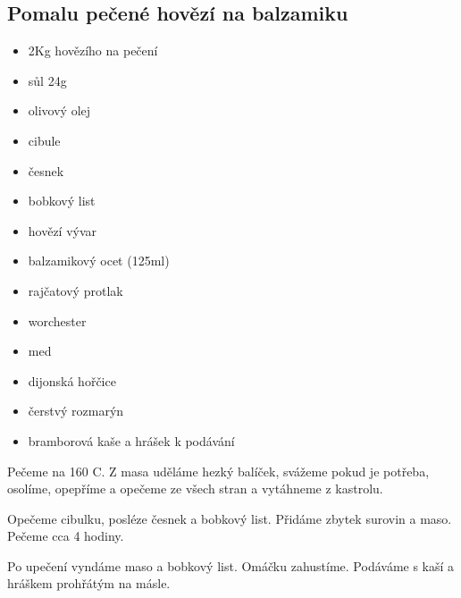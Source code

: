 \documentclass[10pt,a4paper]{article}
\newenvironment{myitemize}
{ \begin{itemize}
    \setlength{\itemsep}{0pt}
    \setlength{\parskip}{0pt}
    \setlength{\parsep}{0pt}     }
{ \end{itemize}                  }
\begin{document}
\subsection{Pomalu pečené hovězí na balzamiku}
\begin{minipage}[t]{0,5\textwidth}
\begin{myitemize} 
\item 2Kg hovězího na pečení
\item sůl 24g
\item olivový olej
\item cibule
\item česnek
\item bobkový list
\item hovězí vývar
\item balzamikový ocet (125ml)
\item rajčatový protlak
\item worchester
\item med
\item dijonská hořčice
\item čerstvý rozmarýn
\item bramborová kaše a hrášek k podávání
\end{myitemize}
\end{minipage}
\begin{minipage}[t]{0,5\textwidth}
Pečeme na 160 \degree C. Z masa uděláme hezký balíček, svážeme pokud je potřeba, osolíme, opepříme a opečeme ze všech stran a vytáhneme z kastrolu.

Opečeme cibulku, posléze česnek a bobkový list. Přidáme zbytek surovin a maso. Pečeme cca 4 hodiny. 

Po upečení vyndáme maso a bobkový list. Omáčku zahustíme. Podáváme s kaší a hráškem prohřátým na másle.
\end{minipage}
\end{document}
